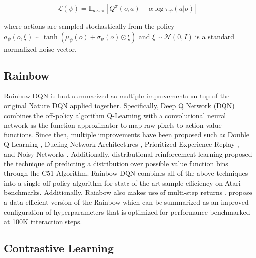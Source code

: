 \documentclass{article}
\begin{document}
\begin{equation}\label{eq:actorloss}
   \mathcal L (\psi) = \mathbb{E}_{a \sim \pi} \left [ Q^\pi (o,a) - \alpha \log \pi_\psi (a|o) \right ]
\end{equation}

where actions are sampled stochastically from the policy $
   a_\psi (o,\xi) \sim \tanh \left (\mu_\psi (o) + \sigma_\psi (o) \odot \xi \right )$ and $\xi \sim \mathcal N (0,I)$ is a standard normalized noise vector. 

\subsection{Rainbow}
Rainbow DQN \cite{hessel2017rainbow} is best summarized as multiple improvements on top of the original Nature DQN \cite{mnih2015human} applied together. Specifically, Deep Q Network (DQN) \cite{mnih2015human} combines the off-policy algorithm Q-Learning with a convolutional neural network as the function approximator to map raw pixels to action value functions. Since then, multiple improvements have been proposed such as Double Q Learning \cite{van2016deep}, Dueling Network Architectures \cite{wang2015dueling}, Prioritized Experience Replay \cite{schaul2015prioritized}, and Noisy Networks \cite{fortunato2017noisy}. Additionally, distributional reinforcement learning \cite{bellemare2017distributional} proposed the technique of predicting a distribution over possible value function bins through the C51 Algorithm. Rainbow DQN combines all of the above techniques into a single off-policy algorithm for state-of-the-art sample efficiency on Atari benchmarks. Additionally, Rainbow also makes use of multi-step returns \cite{sutton1998introduction}. \citet{van2019use} propose a data-efficient version of the Rainbow which can be summarized as an improved configuration of hyperparameters that is optimized for performance benchmarked at 100K interaction steps.


\subsection{Contrastive Learning}
\end{document}
